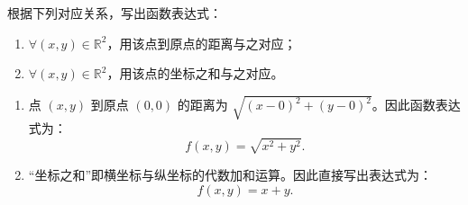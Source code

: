\documentclass[lang=cn,11pt]{elegantbook}
\begin{document}
\begin{exercise}[构造函数表达式]
根据下列对应关系，写出函数表达式：
\begin{enumerate}
  \item[(1)] $\forall (x,y)\in\mathbb{R}^2$，用该点到原点的距离与之对应；
  \item[(2)] $\forall (x,y)\in\mathbb{R}^2$，用该点的坐标之和与之对应。
\end{enumerate}
\end{exercise}
\begin{solution}
\begin{enumerate}
  \item[(1)] 点 $(x,y)$ 到原点 $(0,0)$ 的距离为 $\sqrt{(x-0)^2+(y-0)^2}$。因此函数表达式为：
  \[
  f(x,y) = \sqrt{x^2+y^2}.
  \]
  \item[(2)] “坐标之和”即横坐标与纵坐标的代数加和运算。因此直接写出表达式为：
  \[
  f(x,y) = x+y.
  \]
\end{enumerate}
\end{solution}
\end{document}
